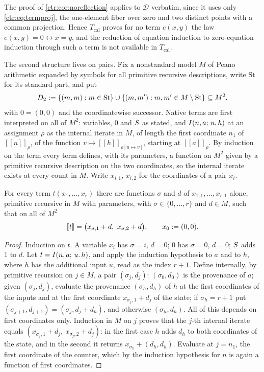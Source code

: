 The proof of \cref{ctr:cor:noreflection} applies to $\mathcal{D}$ verbatim,
since it uses only \eqref{ctr:eq:termproj}, the one-element fiber over zero and
two distinct points with a common projection. Hence $T_{\mathrm{cal}}$ proves
for no term $e(x,y)$ the law $e(x,y)=0\leftrightarrow x=y$, and the reduction
of equation induction to zero-equation induction through such a term is not
available in $T_{\mathrm{cal}}$.

The second structure lives on pairs. Fix a nonstandard model $M$ of Peano
arithmetic expanded by symbols for all primitive recursive descriptions, write
$\mathrm{St}$ for its standard part, and put
\[
D_2\mathrel{:=}\{(m,m):m\in\mathrm{St}\}\cup\{(m,m'):m,m'\in M\setminus\mathrm{St}\}
\subseteq M^{2},
\]
with $0=(0,0)$ and the coordinatewise successor. Native terms are first
interpreted on all of $M^{2}$: variables, $0$ and $S$ as stated, and
$I(n,a;\,u.\,h)$ at an assignment $\rho$ as the internal iterate in $M$,
of length the first coordinate $n_1$ of $[\![n]\!]_\rho$, of the function
$v\mapsto[\![h]\!]_{\rho[u\mapsto v]}$, starting at $[\![a]\!]_\rho$. By
induction on the term every term defines, with its parameters, a function on
$M^{2}$ given by a primitive recursive description on the two coordinates, so
the internal iterate exists at every count in $M$. Write $x_{i,1}$, $x_{i,2}$
for the coordinates of a pair $x_i$.

\begin{lemma}[Provenance]
\label{obs:lem:provenance}
For every term $t(x_1,\dots,x_r)$ there are functions $\sigma$ and $d$ of
$x_{1,1},\dots,x_{r,1}$ alone, primitive recursive in $M$ with parameters,
with $\sigma\in\{0,\dots,r\}$ and $d\in M$, such that on all of $M^{2}$
\[
[\![t]\!]=\bigl(x_{\sigma,1}+d,\ x_{\sigma,2}+d\bigr),\qquad x_0\defeq(0,0).
\]
\end{lemma}

\begin{proof}
Induction on $t$. A variable $x_i$ has $\sigma=i$, $d=0$; $0$ has $\sigma=0$,
$d=0$; $S$ adds $1$ to $d$. Let $t=I(n,a;\,u.\,h)$, and apply the induction
hypothesis to $a$ and to $h$, where $h$ has the additional input $u$, read as
the index $r+1$. Define internally, by primitive recursion on $j\in M$, a pair
$(\sigma_j,d_j)$: $(\sigma_0,d_0)$ is the provenance of $a$; given
$(\sigma_j,d_j)$, evaluate the provenance $(\sigma_h,d_h)$ of $h$ at the first
coordinates of the inputs and at the first coordinate $x_{\sigma_j,1}+d_j$ of
the state; if $\sigma_h=r+1$ put $(\sigma_{j+1},d_{j+1})=(\sigma_j,d_j+d_h)$,
and otherwise $(\sigma_h,d_h)$. All of this depends on first coordinates only.
Induction in $M$ on $j$ proves that the $j$-th internal iterate equals
$(x_{\sigma_j,1}+d_j,\ x_{\sigma_j,2}+d_j)$: in the first case $h$ adds $d_h$ to
both coordinates of the state, and in the second it returns
$x_{\sigma_h}+(d_h,d_h)$. Evaluate at $j=n_1$, the first coordinate of the
counter, which by the induction hypothesis for $n$ is again a function of
first coordinates.
\end{proof}

